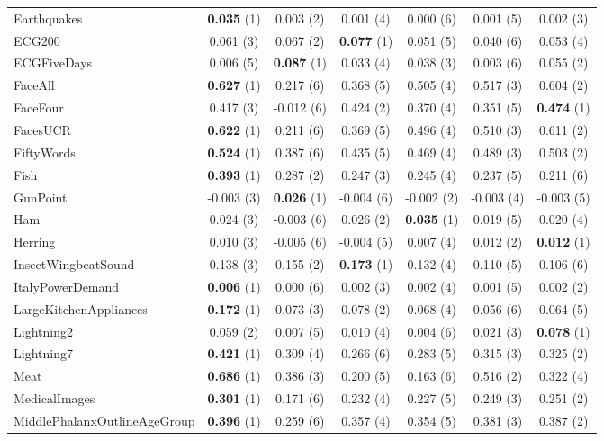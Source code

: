 \begin{table}[ht]
\begin{adjustbox}{width=\textwidth}
\begin{tabular}{lcccccc}
    Earthquakes & \textbf{0.035} (1) & 0.003 (2) & 0.001 (4) & 0.000 (6) & 0.001 (5) & 0.002 (3) \\
    ECG200 & 0.061 (3) & 0.067 (2) & \textbf{0.077} (1) & 0.051 (5) & 0.040 (6) & 0.053 (4) \\
    ECGFiveDays & 0.006 (5) & \textbf{0.087} (1) & 0.033 (4) & 0.038 (3) & 0.003 (6) & 0.055 (2) \\
    FaceAll & \textbf{0.627} (1) & 0.217 (6) & 0.368 (5) & 0.505 (4) & 0.517 (3) & 0.604 (2) \\
    FaceFour & 0.417 (3) & -0.012 (6) & 0.424 (2) & 0.370 (4) & 0.351 (5) & \textbf{0.474} (1) \\
    FacesUCR & \textbf{0.622} (1) & 0.211 (6) & 0.369 (5) & 0.496 (4) & 0.510 (3) & 0.611 (2) \\
    FiftyWords & \textbf{0.524} (1) & 0.387 (6) & 0.435 (5) & 0.469 (4) & 0.489 (3) & 0.503 (2) \\
    Fish & \textbf{0.393} (1) & 0.287 (2) & 0.247 (3) & 0.245 (4) & 0.237 (5) & 0.211 (6) \\
    GunPoint & -0.003 (3) & \textbf{0.026} (1) & -0.004 (6) & -0.002 (2) & -0.003 (4) & -0.003 (5) \\
    Ham & 0.024 (3) & -0.003 (6) & 0.026 (2) & \textbf{0.035} (1) & 0.019 (5) & 0.020 (4) \\
    Herring & 0.010 (3) & -0.005 (6) & -0.004 (5) & 0.007 (4) & 0.012 (2) & \textbf{0.012} (1) \\
    InsectWingbeatSound & 0.138 (3) & 0.155 (2) & \textbf{0.173} (1) & 0.132 (4) & 0.110 (5) & 0.106 (6) \\
    ItalyPowerDemand & \textbf{0.006} (1) & 0.000 (6) & 0.002 (3) & 0.002 (4) & 0.001 (5) & 0.002 (2) \\
    LargeKitchenAppliances & \textbf{0.172} (1) & 0.073 (3) & 0.078 (2) & 0.068 (4) & 0.056 (6) & 0.064 (5) \\
    Lightning2 & 0.059 (2) & 0.007 (5) & 0.010 (4) & 0.004 (6) & 0.021 (3) & \textbf{0.078} (1) \\
    Lightning7 & \textbf{0.421} (1) & 0.309 (4) & 0.266 (6) & 0.283 (5) & 0.315 (3) & 0.325 (2) \\
    Meat & \textbf{0.686} (1) & 0.386 (3) & 0.200 (5) & 0.163 (6) & 0.516 (2) & 0.322 (4) \\
    MedicalImages & \textbf{0.301} (1) & 0.171 (6) & 0.232 (4) & 0.227 (5) & 0.249 (3) & 0.251 (2) \\
    MiddlePhalanxOutlineAgeGroup & \textbf{0.396} (1) & 0.259 (6) & 0.357 (4) & 0.354 (5) & 0.381 (3) & 0.387 (2) \\

\end{tabular}
\end{adjustbox}
\end{table}
